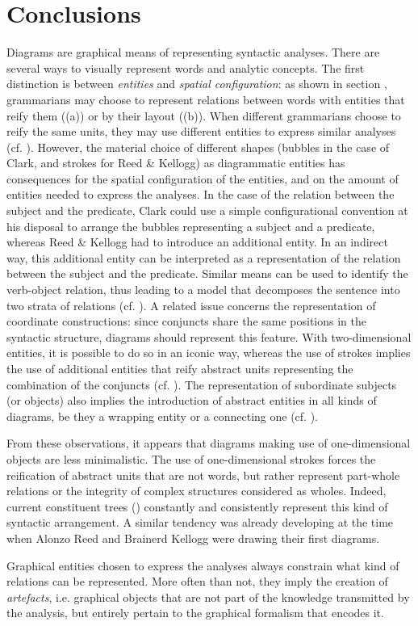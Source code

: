 \documentclass[english,output=paper,colorlinks,citecolor=brown]{../langscibook}
\begin{document}
\section{Conclusions}\label{sec:4:5}

Diagrams are graphical means of representing syntactic analyses. There are several ways to visually represent words and analytic concepts. The first distinction is between \textit{entities} and \textit{spatial configuration}: as shown in section , grammarians may choose to represent relations between words with entities that reify them ((a)) or by their layout ((b)). When different grammarians choose to reify the same units, they may use different entities to express similar analyses (cf. ). However, the material choice of different shapes (bubbles in the case of Clark, and strokes for Reed \& Kellogg) as dia\-grammatic entities has consequences for the spatial configuration of the entities, and on the amount of entities needed to express the analyses. In the case of the relation between the subject and the predicate, Clark could use a simple configurational convention at his disposal to arrange the bubbles representing a subject and a predicate, whereas Reed \& Kellogg had to introduce an additional entity. In an indirect way, this additional entity can be interpreted as a representation of the relation between the subject and the predicate. Similar means can be used to identify the verb-object relation, thus leading to a model that decomposes the sentence into two strata of relations (cf. ). A related issue concerns the representation of coordinate constructions: since conjuncts share the same positions in the syntactic structure, diagrams should represent this feature. With two-dimensional entities, it is possible to do so in an iconic way, whereas the use of strokes implies the use of additional entities that reify abstract units representing the combination of the conjuncts (cf. ). The representation of subordinate subjects (or objects) also implies the introduction of abstract entities in all kinds of diagrams, be they a wrapping entity or a connecting one (cf. ).

From these observations, it appears that diagrams making use of one-di\-men\-sio\-nal objects are less minimalistic. The use of one-dimensional strokes forces the reification of abstract units that are not words, but rather represent part-whole relations or the integrity of complex structures considered as wholes. Indeed, current constituent trees () constantly and consistently represent this kind of syntactic arrangement. A similar tendency was already developing at the time when Alonzo Reed and Brainerd Kellogg were drawing their first diagrams.

Graphical entities chosen to express the analyses always constrain what kind of relations can be represented. More often than not, they imply the creation of \textit{artefacts}, i.e. graphical objects that are not part of the knowledge transmitted by the analysis, but entirely pertain to the graphical formalism that encodes it.

{\sloppy\printbibliography[heading=subbibliography,notkeyword=this]}
\end{document}
